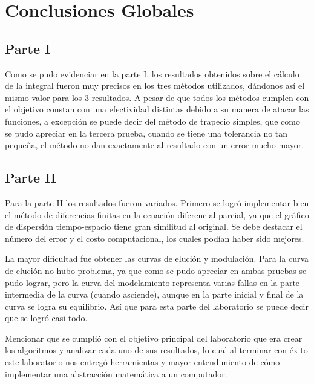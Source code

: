 \section{Conclusiones Globales}

\subsection{Parte I}

\par Como se pudo evidenciar en la parte I, los resultados obtenidos sobre el cálculo de la integral fueron muy precisos en los tres métodos utilizados, dándonos así el mismo valor para los 3 resultados. A pesar de que todos los métodos cumplen con el objetivo constan con una efectividad distintas debido a su manera de atacar las funciones, a excepción se puede decir del método de trapecio simples, que como se pudo apreciar en la tercera prueba, cuando se tiene una tolerancia no tan pequeña, el método no dan exactamente al resultado con un error mucho mayor. 

\subsection{Parte II}

\par  Para la parte II los resultados fueron variados. Primero se logró implementar bien el método de diferencias finitas en la ecuación diferencial parcial, ya que el gráfico de dispersión tiempo-espacio tiene gran similitud al original. Se debe destacar el número del error y el costo computacional, los cuales podían haber sido mejores.

\par La mayor dificultad fue obtener las curvas de elución y modulación. Para la curva de elución no hubo problema, ya que como se pudo apreciar en ambas pruebas se pudo lograr, pero la curva del modelamiento representa varias fallas en la parte intermedia de la curva (cuando asciende), aunque en la parte inicial y final de la curva se logra su equilibrio. Así que para esta parte del laboratorio se puede decir que se logró casi todo.

\par Mencionar que se cumplió con el objetivo principal del laboratorio que
era crear los algoritmos y analizar cada uno de sus resultados, lo cual al terminar con éxito
este laboratorio nos entregó herramientas y mayor entendimiento de cómo implementar una
abstracción matemática a un computador.


